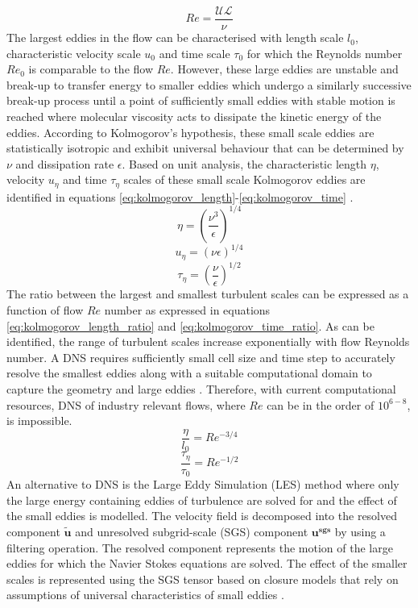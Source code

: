 \begin{equation}
\label{eq:Reynolds}
Re = \frac{\mathcal{U} \mathcal{L}}{\nu}
\end{equation}
The largest eddies in the flow can be characterised with length scale $l_{0}$, characteristic velocity scale $u_{0}$ and time scale $\tau_{0}$ for which the Reynolds number $Re_{0}$ is comparable to the flow $Re$. However, these large eddies are unstable and break-up to transfer energy to smaller eddies which undergo a similarly successive break-up process until a point of sufficiently small eddies with stable motion is reached where molecular viscosity acts to dissipate the kinetic energy of the eddies. According to Kolmogorov's hypothesis, these small scale eddies are statistically isotropic and exhibit universal behaviour that can be determined by $\nu$ and dissipation rate $\epsilon$. Based on unit analysis, the characteristic length $\eta$, velocity $u_{\eta}$ and time $\tau_{\eta}$ scales of these small scale Kolmogorov eddies are identified in equations \ref{eq:kolmogorov_length}-\ref{eq:kolmogorov_time} \cite{Pope2000}. 
\begin{equation}
\label{eq:kolmogorov_length}
\eta = \left(\frac{\nu^{3}}{\epsilon}\right)^{1/4}
\end{equation}
\begin{equation}
\label{eq:kolmogorov_velocity}
u_{\eta} = (\nu \epsilon)^{1/4}
\end{equation}
\begin{equation}
\label{eq:kolmogorov_time}
\tau_{\eta} = \left(\frac{\nu}{\epsilon}\right)^{1/2}
\end{equation}
The ratio between the largest and smallest turbulent scales can be expressed as a function of flow $Re$ number as expressed in equations \ref{eq:kolmogorov_length_ratio} and \ref{eq:kolmogorov_time_ratio}. As can be identified, the range of turbulent scales increase exponentially with flow Reynolds number. A DNS requires sufficiently small cell size and time step to accurately resolve the smallest eddies along with a suitable computational domain to capture the geometry and large eddies \cite{Pope2000}. Therefore, with current computational resources, DNS of industry relevant flows, where $Re$ can be in the order of $10^{6-8}$, is impossible. 
\begin{equation}
\label{eq:kolmogorov_length_ratio}
\frac{\eta}{l_{0}} = Re^{-3/4}
\end{equation}
\begin{equation}
\label{eq:kolmogorov_time_ratio}
\frac{\tau_{\eta}}{\tau_{0}} = Re^{-1/2}
\end{equation}
An alternative to DNS is the Large Eddy Simulation (LES) method where only the large energy containing eddies of turbulence are solved for and the effect of the small eddies is modelled. The velocity field is decomposed into the resolved component $\widetilde{\mathbf{u}}$ and unresolved subgrid-scale (SGS) component $\mathbf{u^{sgs}}$ by using a filtering operation. The resolved component represents the motion of the large eddies for which the Navier Stokes equations are solved. The effect of the smaller scales is represented using the SGS tensor based on closure models that rely on assumptions of universal characteristics of small eddies \cite{Pope2000}.

